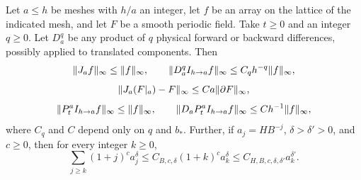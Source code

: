\begin{lemma}\label{ch25:lem:elementary-estimates}
Let $a\le h$ be meshes with $h/a$ an integer, let $f$ be an array on the lattice of the indicated mesh, and let $F$ be a smooth periodic field. Take $t\ge0$ and an integer $q\ge0$. Let $D_a^q$ be any product of $q$ physical forward or backward differences, possibly applied to translated components. Then
\begin{equation}\label{ch25:eq:cardinal-elementary}
 \lVert J_af\rVert_\infty\le\lVert f\rVert_\infty,\qquad
 \lVert D_a^qI_{h\to a}f\rVert_\infty\le C_qh^{-q}\lVert f\rVert_\infty,
\end{equation}
\begin{equation}\label{ch25:eq:cardinal-sampling}
 \lVert J_a(F|_a)-F\rVert_\infty\le Ca\lVert \partial F\rVert_\infty,
\end{equation}
\begin{equation}\label{ch25:eq:coarse-heat-short}
 \lVert P_{t}^{a} I_{h\to a}f\rVert_\infty\le\lVert f\rVert_\infty,\qquad
 \lVert D_aP_{t}^{a} I_{h\to a}f\rVert_\infty\le Ch^{-1}\lVert f\rVert_\infty,
\end{equation}
where $C_q$ and $C$ depend only on $q$ and $b_*$. Further, if $a_j=HB^{-j}$, $\delta>\delta'>0$, and $c\ge0$, then for every integer $k\ge0$,
\begin{equation}\label{ch25:eq:geometric-sums}
 \sum_{j\ge k}(1+j)^ca_j^\delta\le C_{B,c,\delta}(1+k)^ca_k^\delta\le C_{H,B,c,\delta,\delta'}a_k^{\delta'}.
\end{equation}
\end{lemma}

